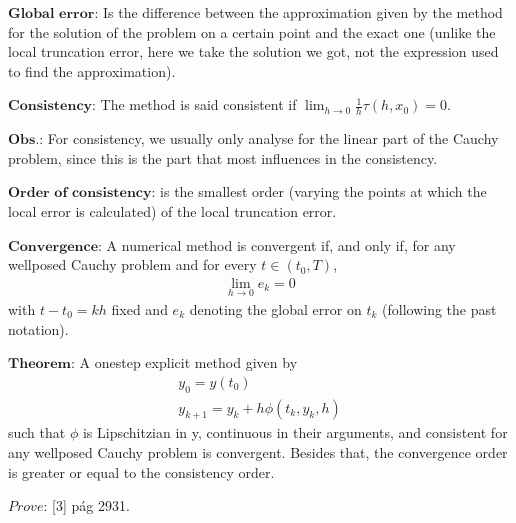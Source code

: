 \documentclass[letterpaper,10pt,english]{jupyterBook}
\begin{document}
\sphinxAtStartPar
\(\textbf{Global error:}\) Is the difference between the approximation given by the method for the solution of the problem on a certain point and the exact one (unlike the local truncation error, here we take the solution we got, not the expression used to find the approximation).

\sphinxAtStartPar
\(\textbf{Consistency:}\) The method is said consistent if \(\lim _{h \to 0} \frac{1}{h}\tau(h,x_0) = 0\).

\sphinxAtStartPar
\(\textbf{Obs.:}\) For consistency, we usually only analyse for the linear part of the Cauchy problem, since this is the part that most influences in the consistency.

\sphinxAtStartPar
\(\textbf{Order of consistency:}\) is the smallest order (varying the points at which the local error is calculated) of the local truncation error.

\sphinxAtStartPar
\(\textbf{Convergence:}\) A numerical method is convergent if, and only if, for any well\sphinxhyphen{}posed Cauchy problem and for every \(t \in (t_0, T)\),
\begin{equation*}
\begin{split}\lim_{h \to 0} e_k = 0\end{split}
\end{equation*}
\sphinxAtStartPar
with \(t - t_0 = kh\) fixed and \(e_k\) denoting the global error on \(t_k\) (following the past notation).

\sphinxAtStartPar
\(\textbf{Theorem:}\) A one\sphinxhyphen{}step explicit method given by
\begin{equation*}
\begin{split}
y_0 = y(t_0) \\
y_{k+1} = y_{k} + h \phi (t_{k},y_{k},h)
\end{split}
\end{equation*}
\sphinxAtStartPar
such that \(\phi\) is Lipschitzian in y, continuous in their arguments, and consistent for any well\sphinxhyphen{}posed Cauchy problem is convergent. Besides that, the convergence order is greater or equal to the consistency order.

\sphinxAtStartPar
\(\textit{Prove:}\) {[}3{]} pág 29\sphinxhyphen{}31.
\end{document}
